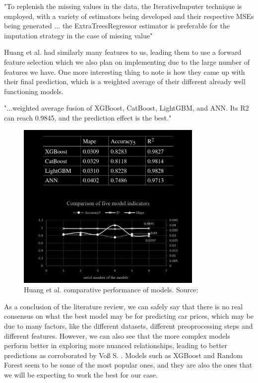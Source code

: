 \documentclass[12pt]{article}
\begin{document}
\begin{displayquote}
  "To replenish the missing values in the data, the IterativeImputer technique is employed, with a variety of estimators being developed and their respective MSEs being generated ... the ExtraTreesRegressor estimator is preferable for the imputation strategy in the case of missing value"
\end{displayquote}

Huang et al. \cite{huangUsedCarPrice2022} had similarly many features to us, leading them to use a forward feature selection which we also plan on implementing due to the large number of features we have. One more interesting thing to note is how they came up with their final prediction, which is a weighted average of their different already well functioning models.

\begin{displayquote}
  "...weighted average fusion of XGBoost, CatBoost, LightGBM, and ANN. Its R2 can reach 0.9845, and the prediction effect is the best."
\end{displayquote}

\begin{figure}[ht]
  \centering
  \includegraphics[width=0.8\textwidth]{./images/huang_et_al_findings.png}
  \caption{Huang et al. comparative performance of models. Source: \cite{huangUsedCarPrice2022}}
  \label{fig:huang_et_al_findings}
\end{figure}

As a conclusion of the literature review, we can safely say that there is no real consensus on what the best model may be for predicting car prices, which may be due to many factors, like the different datasets, different preoprocessing steps and different features. However, we can also see that the more complex models perform better in exploring more nuanced relationships, leading to better predictions as corroborated by Voß S. \cite{vossResalePricePrediction}. Models such as XGBoost and Random Forest seem to be some of the most popular ones, and they are also the ones that we will be expecting to work the best for our case.
\end{document}
